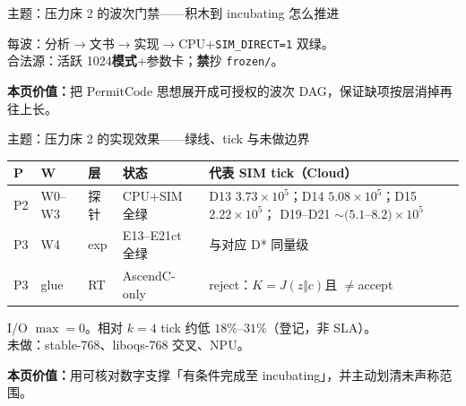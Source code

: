 \documentclass[UTF8,aspectratio=169,11pt]{ctexbeamer}
\newcommand{\pagesummary}[1]{%
  \vfill
  {\footnotesize\noindent\textbf{本页价值：}#1\par}%
}
\begin{document}
\begin{frame}{主题：压力床 2 的波次门禁——积木到 incubating 怎么推进}
\begin{center}
\end{center}
{\footnotesize
每波：分析$\to$文书$\to$实现$\to$CPU+\texttt{SIM\_DIRECT=1} 双绿。\\
合法源：活跃 1024\textbf{模式}+参数卡；\textbf{禁}抄 \texttt{frozen/}。
}
\pagesummary{把 $\mathrm{PermitCode}$ 思想展开成可授权的波次 DAG，保证缺项按层消掉再往上长。}
\end{frame}

\begin{frame}{主题：压力床 2 的实现效果——绿线、tick 与未做边界}
{\footnotesize
\begin{center}
\begin{tabular}{@{}L{0.6cm}L{1.0cm}L{2.4cm}L{3.0cm}L{6.4cm}@{}}
  \toprule
  P & W & 层 & 状态 & 代表 SIM tick（Cloud） \\
  \midrule
  P2 & W0--W3 & 探针 & CPU+SIM 全绿 &
  D13 $3.73{\times}10^5$；D14 $5.08{\times}10^5$；D15 $2.22{\times}10^5$；
  D19--D21 $\sim(5.1$--$8.2){\times}10^5$ \\
  P3 & W4 & exp & E13--E21ct 全绿 & 与对应 D* 同量级 \\
  P3 & glue & RT & AscendC-only & reject：$K{=}J(z\Vert c)$且 $\neq$accept \\
  \bottomrule
\end{tabular}
\end{center}
I/O $\max{=}0$。相对 $k{=}4$ tick 约低 $18\%$--$31\%$（登记，非 SLA）。\\
未做：stable-768、liboqs-768 交叉、NPU。
}
\pagesummary{用可核对数字支撑「有条件完成至 incubating」，并主动划清未声称范围。}
\end{frame}
\end{document}
